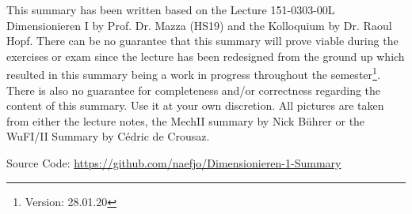 



\maketitle
\begin{center}
    This summary has been written based on the Lecture 151-0303-00L  Dimensionieren I by Prof. Dr. Mazza (HS19) and the Kolloquium by Dr. Raoul Hopf. There can be no guarantee that this summary will prove viable during the exercises or exam since the lecture has been redesigned from the ground up which resulted in this summary being a work in progress throughout the semester\footnote{\label{foot:2}Version: 28.01.20}. There is also no guarantee for completeness and/or correctness regarding the content of this summary. Use it at your own discretion. All pictures are taken from either the lecture notes, the MechII summary by Nick Bührer or the WuFI/II Summary by Cédric de Crousaz.
    
    Source Code: \url{https://github.com/naefjo/Dimensionieren-1-Summary}
    
\end{center}
\newpage
\begin{multicols*}{3}






















\end{multicols*}     

